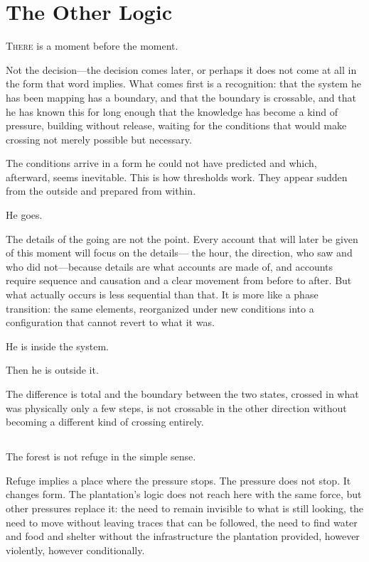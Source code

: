 
\chapter{The Other Logic}


\lettrine{T}{here} is a moment before the moment.

Not the decision---the decision comes later, or perhaps it does
not come at all in the form that word implies. What comes first
is a recognition: that the system he has been mapping has a
boundary, and that the boundary is crossable, and that he has
known this for long enough that the knowledge has become a kind
of pressure, building without release, waiting for the conditions
that would make crossing not merely possible but necessary.

The conditions arrive in a form he could not have predicted and
which, afterward, seems inevitable. This is how thresholds work.
They appear sudden from the outside and prepared from within.

He goes.

The details of the going are not the point. Every account that
will later be given of this moment will focus on the details---
the hour, the direction, who saw and who did not---because details
are what accounts are made of, and accounts require sequence and
causation and a clear movement from before to after. But what
actually occurs is less sequential than that. It is more like a
phase transition: the same elements, reorganized under new
conditions into a configuration that cannot revert to what it was.

He is inside the system.

Then he is outside it.

The difference is total and the boundary between the two states,
crossed in what was physically only a few steps, is not crossable
in the other direction without becoming a different kind of
crossing entirely.

\section{}

The forest is not refuge in the simple sense.

Refuge implies a place where the pressure stops. The pressure does
not stop. It changes form. The plantation's logic does not reach
here with the same force, but other pressures replace it: the
need to remain invisible to what is still looking, the need to
move without leaving traces that can be followed, the need to
find water and food and shelter without the infrastructure the
plantation provided, however violently, however conditionally.


